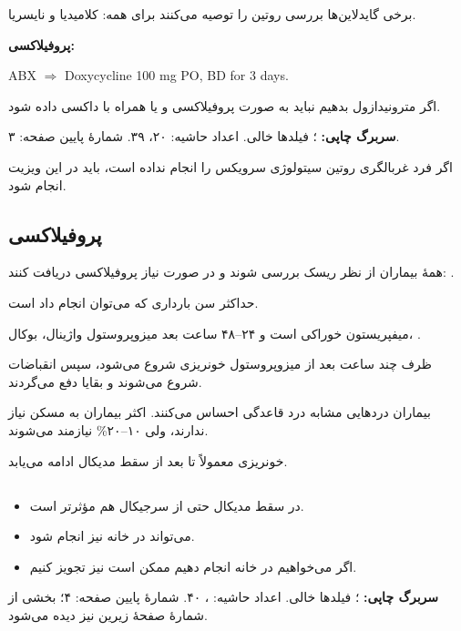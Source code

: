 \documentclass[12pt,a4paper]{article}
\begin{document}
برخی گایدلاین‌ها بررسی روتین  را توصیه می‌کنند برای همه: کلامیدیا و نایسریا.

\textbf{پروفیلاکسی:}
\begin{latin}
ABX \(\Longrightarrow\) Doxycycline 100 mg PO, BD for 3 days.
\end{latin}

اگر مترونیدازول بدهیم نباید به صورت پروفیلاکسی و یا همراه با داکسی داده شود.

\textbf{سربرگ چاپی:} ؛ فیلدها خالی. اعداد حاشیه: ۲۰، ۳۹. شمارهٔ پایین صفحه: ۳.

اگر فرد غربالگری روتین سیتولوژی سرویکس را انجام نداده است، باید در این ویزیت انجام شود.

\subsection*{پروفیلاکسی }
همهٔ بیماران از نظر ریسک  بررسی شوند و در صورت نیاز پروفیلاکسی دریافت کنند: .

حداکثر سن بارداری که می‌توان  انجام داد  است.

میفپریستون خوراکی است و ۲۴–۴۸ ساعت بعد میزوپروستول واژینال، بوکال، .

ظرف چند ساعت بعد از میزوپروستول خونریزی شروع می‌شود، سپس انقباضات شروع می‌شوند و بقایا دفع می‌گردند.

بیماران دردهایی مشابه درد قاعدگی احساس می‌کنند. اکثر بیماران به مسکن نیاز ندارند، ولی ۱۰–۲۰\% نیازمند  می‌شوند.

خونریزی معمولاً تا  بعد از سقط مدیکال ادامه می‌یابد.

\subsection*{}
\begin{itemize}
\item در  سقط مدیکال حتی از سرجیکال هم مؤثرتر است.
\item می‌تواند در خانه نیز انجام شود.
\item اگر می‌خواهیم در خانه انجام دهیم ممکن است  نیز تجویز کنیم.
\end{itemize}

\textbf{سربرگ چاپی:} ؛ فیلدها خالی. اعداد حاشیه: ، ۴۰. شمارهٔ پایین صفحه: ۴؛ بخشی از شمارهٔ صفحهٔ زیرین نیز دیده می‌شود.
\end{document}
